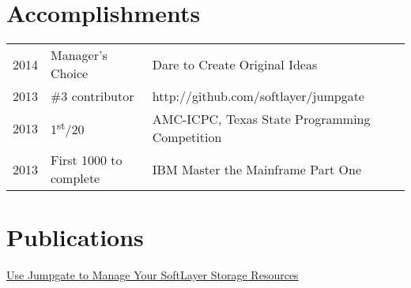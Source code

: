 \documentclass[letterpaper]{resume} %
\begin{document}
\begin{minipage}[t]{0.66\textwidth}
\sectionspace %



\section{Accomplishments} 

\begin{tabular}{rll}
2014	 & Manager's Choice & Dare to Create Original Ideas\\
2013  & \#3 contributor & http://github.com/softlayer/jumpgate \\
2013	 & 1\textsuperscript{st}/20 & AMC-ICPC, Texas State Programming Competition\\
2013	 & First 1000 to complete & IBM Master the Mainframe Part One\\
\end{tabular}

\sectionspace %


\section{Publications}

\href{http://sldn.softlayer.com/blog/Isaac-Karrer/Use-Jumpgate-Manage-Your-SoftLayer-Storage-Resources}{Use Jumpgate to Manage Your SoftLayer Storage Resources}

 
\sectionspace

\end{minipage} %




\end{document}
